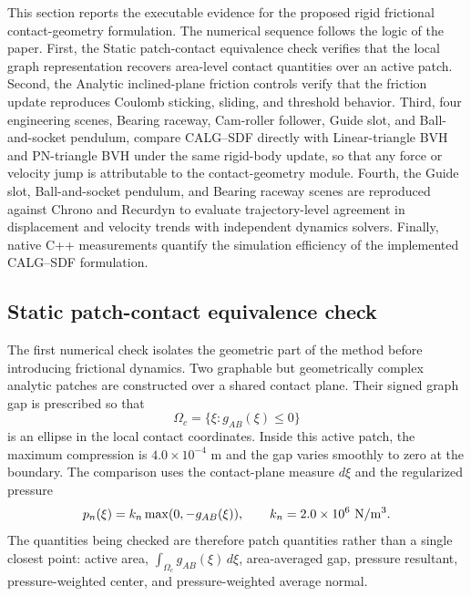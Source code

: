 \documentclass[preprint,12pt]{elsarticle}
\newcommand{\calg}{\textsc{CALG}}
\begin{document}
This section reports the executable evidence for the proposed rigid frictional contact-geometry formulation. The numerical sequence follows the logic of the paper. First, the Static patch-contact equivalence check verifies that the local graph representation recovers area-level contact quantities over an active patch. Second, the Analytic inclined-plane friction controls verify that the friction update reproduces Coulomb sticking, sliding, and threshold behavior. Third, four engineering scenes, Bearing raceway, Cam-roller follower, Guide slot, and Ball-and-socket pendulum, compare \calg{}--SDF directly with Linear-triangle BVH and PN-triangle BVH under the same rigid-body update, so that any force or velocity jump is attributable to the contact-geometry module. Fourth, the Guide slot, Ball-and-socket pendulum, and Bearing raceway scenes are reproduced against Chrono and Recurdyn to evaluate trajectory-level agreement in displacement and velocity trends with independent dynamics solvers. Finally, native C++ measurements quantify the simulation efficiency of the implemented \calg{}--SDF formulation.

\subsection{Static patch-contact equivalence check}

The first numerical check isolates the geometric part of the method before introducing frictional dynamics. Two graphable but geometrically complex analytic patches are constructed over a shared contact plane. Their signed graph gap is prescribed so that
\begin{equation}
    \Omega_c=\{\xi:g_{AB}(\xi)\le 0\}
\end{equation}
is an ellipse in the local contact coordinates. Inside this active patch, the maximum compression is $4.0\times10^{-4}$ m and the gap varies smoothly to zero at the boundary. The comparison uses the contact-plane measure $d\xi$ and the regularized pressure
\begin{equation}
    p_n(\xi)=k_n\max(0,-g_{AB}(\xi)),
    \qquad k_n=2.0\times10^6~{\rm N/m^3}.
\end{equation}
The quantities being checked are therefore patch quantities rather than a single closest point: active area, $\int_{\Omega_c}g_{AB}(\xi)\,d\xi$, area-averaged gap, pressure resultant, pressure-weighted center, and pressure-weighted average normal.
\end{document}

